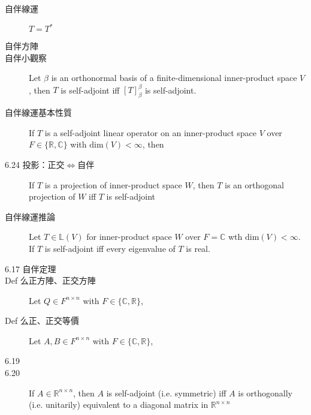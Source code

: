 \documentclass[9pt, twocolumn]{extarticle}
\begin{document}
\begin{description}
    \item[自伴線運] $T = T^*$
    \item[自伴方陣] 
    \item[自伴小觀察] Let $\beta$ is an orthonormal basis of a finite-dimensional inner-product space $V$, then $T$ is self-adjoint iff $[T]^\beta_\beta$ is self-adjoint.
    \item[自伴線運基本性質] If $T$ is a self-adjoint linear operator on an inner-product space $V$ over $F \in \{\mathbb{R}, \mathbb{C}\}$ with $\text{dim}(V)<\infty$, then
    \item[6.24 投影：正交$\Leftrightarrow$自伴] If $T$ is a projection of inner-product space $W$, then $T$ is an orthogonal projection of $W$ iff $T$ is self-adjoint
    \item[自伴線運推論] Let $T \in \mathbb{L}(V)$ for inner-product space $W$ over $F = \mathbb{C}$ wth $\text{dim}(V) < \infty$. If $T$ is self-adjoint iff every eigenvalue of $T$ is real.
    \item[6.17 自伴定理]
    \item[Def 么正方陣、正交方陣] Let $Q \in F^{n\times n}$ with $F \in \{\mathbb{C}, \mathbb{R}\}$,
    \item[Def 么正、正交等價] Let $A, B \in F^{n \times n}$ with $F \in \{\mathbb{C}, \mathbb{R}\}$,
    \item[6.19]
    \item[6.20] If $A \in \mathbb{R}^{n\times n}$, then $A$ is self-adjoint (i.e. symmetric) iff $A$ is orthogonally (i.e. unitarily) equivalent to a diagonal matrix in $\mathbb{R}^{n\times n}$

        
\end{description}
\end{document}
